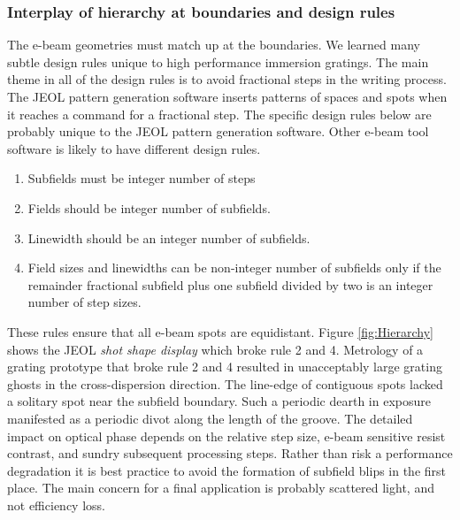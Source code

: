 \documentclass[]{spie}  %
\begin{document}
\subsubsection{Interplay of hierarchy at boundaries and design rules}
\label{sec:Boundaries}
The e-beam geometries must match up at the boundaries.  We learned many subtle design rules unique to high performance immersion gratings.  The main theme in all of the design rules is to avoid fractional steps in the writing process.  The JEOL pattern generation software inserts patterns of spaces and spots when it reaches a command for a fractional step.  The specific design rules below are probably unique to the JEOL pattern generation software.  Other e-beam tool software is likely to have different design rules.
\begin{enumerate}
  \item Subfields must be integer number of steps
  \item Fields should be integer number of subfields.  
  \item Linewidth should be an integer number of subfields.
  \item Field sizes and linewidths can be non-integer number of subfields only if the remainder fractional subfield plus one subfield divided by two is an integer number of step sizes.
\end{enumerate}   

These rules ensure that all e-beam spots are equidistant.  Figure \ref{fig:Hierarchy}  shows the JEOL \emph{shot shape display} which broke rule 2 and 4.  Metrology of a grating prototype that broke rule 2 and 4 resulted in unacceptably large grating ghosts in the cross-dispersion direction.  The line-edge of contiguous spots lacked a solitary spot near the subfield boundary.  Such a periodic dearth in exposure manifested as a periodic divot along the length of the groove.  The detailed impact on optical phase depends on the relative step size, e-beam sensitive resist contrast, and sundry subsequent processing steps.  Rather than risk a performance degradation it is best practice to avoid the formation of subfield blips in the first place.  The main concern for a final application is probably scattered light, and not efficiency loss. 
\end{document}
